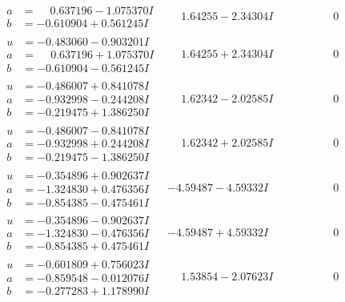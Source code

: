 \documentclass[1p]{elsarticle_modified}
\theoremstyle{definition}
\begin{document}
$$\begin{array}{c|c|c}
\begin{aligned}
a &= \phantom{-}0.637196 - 1.075370 I \\
b &= -0.610904 + 0.561245 I\end{aligned}
 & \phantom{-}1.64255 - 2.34304 I & \phantom{-0.000000 } 0 \\ \hline\begin{aligned}
u &= -0.483060 - 0.903201 I \\
a &= \phantom{-}0.637196 + 1.075370 I \\
b &= -0.610904 - 0.561245 I\end{aligned}
 & \phantom{-}1.64255 + 2.34304 I & \phantom{-0.000000 } 0 \\ \hline\begin{aligned}
u &= -0.486007 + 0.841078 I \\
a &= -0.932998 - 0.244208 I \\
b &= -0.219475 + 1.386250 I\end{aligned}
 & \phantom{-}1.62342 - 2.02585 I & \phantom{-0.000000 } 0 \\ \hline\begin{aligned}
u &= -0.486007 - 0.841078 I \\
a &= -0.932998 + 0.244208 I \\
b &= -0.219475 - 1.386250 I\end{aligned}
 & \phantom{-}1.62342 + 2.02585 I & \phantom{-0.000000 } 0 \\ \hline\begin{aligned}
u &= -0.354896 + 0.902637 I \\
a &= -1.324830 + 0.476356 I \\
b &= -0.854385 - 0.475461 I\end{aligned}
 & -4.59487 - 4.59332 I & \phantom{-0.000000 } 0 \\ \hline\begin{aligned}
u &= -0.354896 - 0.902637 I \\
a &= -1.324830 - 0.476356 I \\
b &= -0.854385 + 0.475461 I\end{aligned}
 & -4.59487 + 4.59332 I & \phantom{-0.000000 } 0 \\ \hline\begin{aligned}
u &= -0.601809 + 0.756023 I \\
a &= -0.859548 - 0.012076 I \\
b &= -0.277283 + 1.178990 I\end{aligned}
 & \phantom{-}1.53854 - 2.07623 I & \phantom{-0.000000 } 0 \\ \hline\begin{aligned}

\end{aligned}
\end{array}$$
\end{document}
